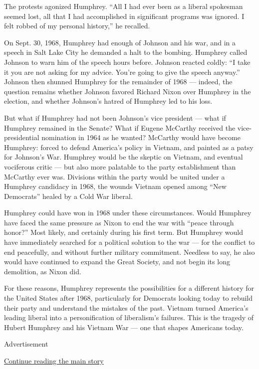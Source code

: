 The protests agonized Humphrey. ``All I had ever been as a liberal
spokesman seemed lost, all that I had accomplished in significant
programs was ignored. I felt robbed of my personal history,'' he
recalled.

On Sept. 30, 1968, Humphrey had enough of Johnson and his war, and in a
speech in Salt Lake City he demanded a halt to the bombing. Humphrey
called Johnson to warn him of the speech hours before. Johnson reacted
coldly: ``I take it you are not asking for my advice. You're going to
give the speech anyway.'' Johnson then shunned Humphrey for the
remainder of 1968 --- indeed, the question remains whether Johnson
favored Richard Nixon over Humphrey in the election, and whether
Johnson's hatred of Humphrey led to his loss.

But what if Humphrey had not been Johnson's vice president --- what if
Humphrey remained in the Senate? What if Eugene McCarthy received the
vice-presidential nomination in 1964 as he wanted? McCarthy would have
become Humphrey: forced to defend America's policy in Vietnam, and
painted as a patsy for Johnson's War. Humphrey would be the skeptic on
Vietnam, and eventual vociferous critic --- but also more palatable to
the party establishment than McCarthy ever was. Divisions within the
party would be united under a Humphrey candidacy in 1968, the wounds
Vietnam opened among ``New Democrats'' healed by a Cold War liberal.

Humphrey could have won in 1968 under these circumstances. Would
Humphrey have faced the same pressure as Nixon to end the war with
``peace through honor?'' Most likely, and certainly during his first
term. But Humphrey would have immediately searched for a political
solution to the war --- for the conflict to end peacefully, and without
further military commitment. Needless to say, he also would have
continued to expand the Great Society, and not begin its long
demolition, as Nixon did.

For these reasons, Humphrey represents the possibilities for a different
history for the United States after 1968, particularly for Democrats
looking today to rebuild their party and understand the mistakes of the
past. Vietnam turned America's leading liberal into a personification of
liberalism's failures. This is the tragedy of Hubert Humphrey and his
Vietnam War --- one that shapes Americans today.

Advertisement

\protect\hyperlink{after-bottom}{Continue reading the main story}

